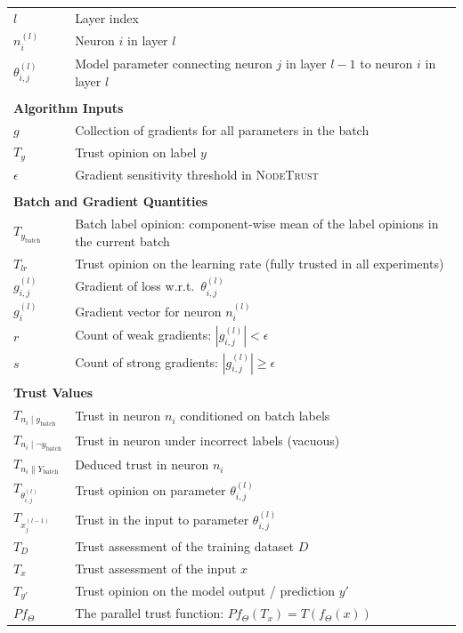 \begin{longtable}{lp{9cm}}
$l$ & Layer index \\
$n_i^{(l)}$ & Neuron $i$ in layer $l$ \\
$\theta^{(l)}_{i,j}$ & Model parameter connecting neuron $j$ in layer $l{-}1$ to neuron $i$ in layer $l$ \\[4pt]
\hline
\\
\hline
\multicolumn{2}{l}{\textbf{Algorithm Inputs}} \\
$g$ & Collection of gradients for all parameters in the batch \\
$T_y$ & Trust opinion on label $y$ \\
$\epsilon$ & Gradient sensitivity threshold in \textsc{NodeTrust} \\[4pt]
\hline
\\
\hline
\multicolumn{2}{l}{\textbf{Batch and Gradient Quantities}} \\
$T_{y_{\text{batch}}}$ & Batch label opinion: component-wise mean of the label opinions in the current batch \\
$T_{lr}$ & Trust opinion on the learning rate (fully trusted in all experiments) \\
$g^{(l)}_{i,j}$ & Gradient of loss w.r.t.\ $\theta^{(l)}_{i,j}$ \\
$g^{(l)}_{i}$ & Gradient vector for neuron $n_i^{(l)}$ \\
$r$ & Count of weak gradients: $|g^{(l)}_{i,j}| < \epsilon$ \\
$s$ & Count of strong gradients: $|g^{(l)}_{i,j}| \ge \epsilon$ \\[4pt]
\hline
\\
\hline
\multicolumn{2}{l}{\textbf{Trust Values}} \\
$T_{n_i \mid y_{\text{batch}}}$ & Trust in neuron $n_i$ conditioned on batch labels \\
$T_{n_i \mid \lnot y_{\text{batch}}}$ & Trust in neuron under incorrect labels (vacuous) \\
$T_{n_i \parallel Y_{\text{batch}}}$ & Deduced trust in neuron $n_i$ \\
$T_{\theta^{(l)}_{i,j}}$ & Trust opinion on parameter $\theta^{(l)}_{i,j}$ \\
$T_{x^{(l-1)}_j}$ & Trust in the input to parameter $\theta^{(l)}_{i,j}$ \\

$T_D$ & Trust assessment of the training dataset $D$ \\
$T_x$ & Trust assessment of the input $x$ \\

$T_{y'}$ & Trust opinion on the model output / prediction $y'$ \\
$Pf_\Theta$ & The parallel trust function: $Pf_\Theta(T_x) = T(f_\Theta(x))$ \\
\hline


\end{longtable}